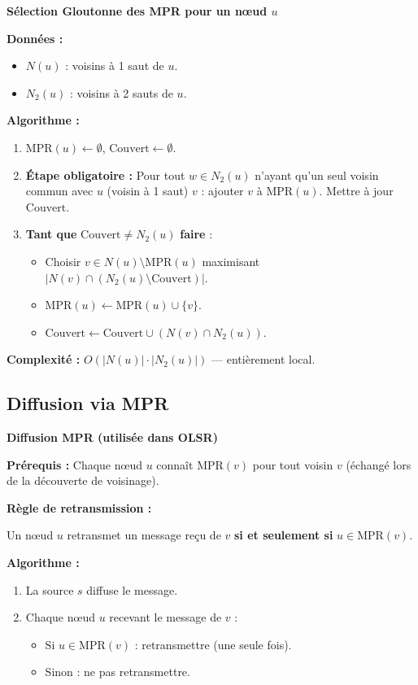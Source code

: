 \documentclass[12pt,a4paper]{article}
\begin{document}
\begin{algorithme}
\textbf{Sélection Gloutonne des MPR pour un nœud $u$}

\textbf{Données :}
\begin{itemize}
    \item $N(u)$ : voisins à 1 saut de $u$.
    \item $N_2(u)$ : voisins à 2 sauts de $u$.
\end{itemize}

\textbf{Algorithme :}
\begin{enumerate}
    \item $\text{MPR}(u) \leftarrow \emptyset$, $\text{Couvert} \leftarrow \emptyset$.
    \item \textbf{Étape obligatoire :} Pour tout $w \in N_2(u)$ n'ayant qu'un seul voisin
          commun avec $u$ (voisin à 1 saut) $v$ : ajouter $v$ à $\text{MPR}(u)$.
          Mettre à jour $\text{Couvert}$.
    \item \textbf{Tant que} $\text{Couvert} \neq N_2(u)$ \textbf{faire} :
    \begin{itemize}
        \item Choisir $v \in N(u) \setminus \text{MPR}(u)$ maximisant
              $|N(v) \cap (N_2(u) \setminus \text{Couvert})|$.
        \item $\text{MPR}(u) \leftarrow \text{MPR}(u) \cup \{v\}$.
        \item $\text{Couvert} \leftarrow \text{Couvert} \cup (N(v) \cap N_2(u))$.
    \end{itemize}
\end{enumerate}

\textbf{Complexité :} $O(|N(u)| \cdot |N_2(u)|)$ --- entièrement local.
\end{algorithme}

\subsection{Diffusion via MPR}

\begin{algorithme}
\textbf{Diffusion MPR (utilisée dans OLSR)}

\textbf{Prérequis :} Chaque nœud $u$ connaît $\text{MPR}(v)$ pour tout voisin $v$ (échangé
lors de la découverte de voisinage).

\textbf{Règle de retransmission :}

Un nœud $u$ retransmet un message reçu de $v$ \textbf{si et seulement si}
$u \in \text{MPR}(v)$.

\textbf{Algorithme :}
\begin{enumerate}
    \item La source $s$ diffuse le message.
    \item Chaque nœud $u$ recevant le message de $v$ :
    \begin{itemize}
        \item Si $u \in \text{MPR}(v)$ : retransmettre (une seule fois).
        \item Sinon : ne pas retransmettre.
    \end{itemize}
\end{enumerate}
\end{algorithme}
\end{document}
